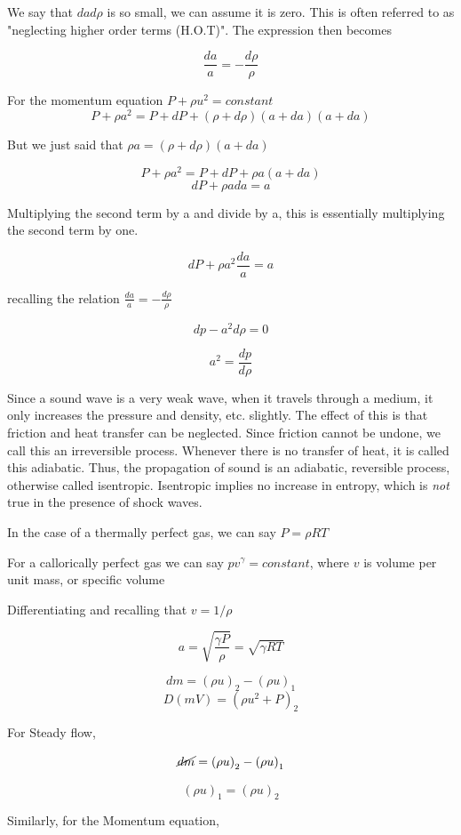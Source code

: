 \documentclass[12pt]{article}
\begin{document}
We say that $da d\rho$ is so small, we can assume it is zero. This is often referred to as "neglecting higher order terms (H.O.T)". The expression then becomes

\[\frac{da}{a} = -\frac{d \rho}{\rho}\]

For the momentum equation $P + \rho u^2 = constant$
\[P + \rho a^2  = P + dP +  (\rho + d\rho)(a + da)(a + da) \]

But we just said that $\rho a = (\rho + d\rho)(a + da)$


\[P + \rho a^2  = P + dP +  \rho a(a + da) \]
\[dP + \rho ada = a\]

Multiplying the second term by a and divide by a, this is essentially multiplying the second term by one.

\[dP + \rho a^2\frac{da}{a} = a\]

recalling the relation $\frac{da}{a} = -\frac{d \rho}{\rho}$

\[dp - a^2 d \rho = 0\]

                       \[a^2 = \frac{dp}{d\rho}\]

Since a sound wave is a very weak wave, when it travels through a medium, it only increases the pressure and density, etc. slightly. The effect of this is that friction  and heat transfer can be neglected. Since friction cannot be undone, we call this an irreversible process. Whenever there is no transfer of heat, it is called this adiabatic. Thus, the propagation of sound is an adiabatic, reversible process, otherwise called isentropic. Isentropic implies no increase in entropy, which is \textit{not} true in the presence of shock waves.

In the case of a thermally perfect gas, we can say $P = \rho R T$

For a callorically perfect gas we can say $pv^{\gamma} = constant$, where $v$ is volume per unit mass, or specific volume

Differentiating and recalling that $v = 1/\rho$

\[a = \sqrt{\frac{\gamma P}{\rho}} = \sqrt{\gamma R T}\]


\[dm = \left( \rho u\right)_2 - \left(\rho u\right)_1\]
\[D(mV) = \left(\rho u^2 + P \right)_2\]

For Steady flow,

\[\cancel{dm} = \left( \rho u\right)_2 - \left(\rho u\right)_1\]

\[ \left( \rho u\right)_1 = \left(\rho u\right)_2\]

Similarly, for the Momentum equation,
\end{document}
